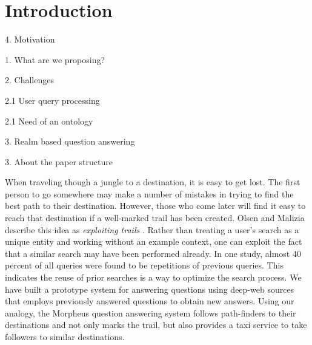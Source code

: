 \section{Introduction}


4. Motivation 

1. What are we proposing?  

2. Challenges

  2.1 User query processing 

  2.1 Need of an ontology 

3. Realm based question answering 

3. About the paper structure  



When traveling though a jungle to a destination, it is easy to get
lost.  The first person to go somewhere may make a number of mistakes
in trying to find the best path to their destination.  However, those
who come later will find it easy to reach that destination if a
well-marked trail has been created. Olsen and Malizia describe this
idea as \emph{exploiting trails} \cite{5379671}.  Rather than treating
a user's search as a unique entity and working without an example
context, one can exploit the fact that a similar search may have been
performed already.  In one study, almost 40 percent of all queries
were found to be repetitions of previous queries\cite{1277770}. This
indicates the reuse of prior searches is a way to optimize the search
process.  We have built a prototype system for answering questions
using deep-web sources that employs previously answered questions to
obtain new answers.  Using our analogy, the Morpheus question
answering system follows path-finders to their destinations and not
only marks the trail, but also provides a taxi service to take
followers to similar destinations.
